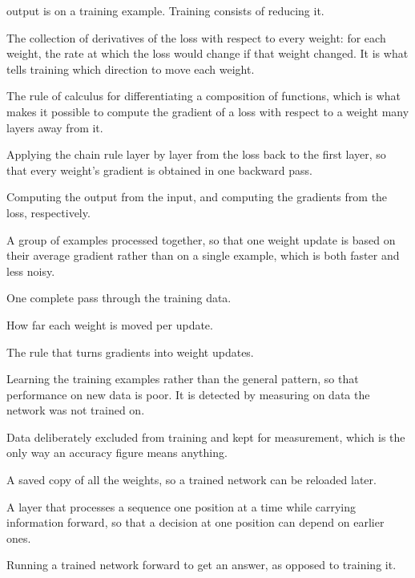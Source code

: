 \begin{description}[style=nextline,leftmargin=1.4em]
        output is on a training example. Training consists of reducing it.
  \item[Gradient] The collection of derivatives of the loss with respect to
        every weight: for each weight, the rate at which the loss would
        change if that weight changed. It is what tells training which
        direction to move each weight.
  \item[Chain rule] The rule of calculus for differentiating a composition of
        functions, which is what makes it possible to compute the gradient of
        a loss with respect to a weight many layers away from it.
  \item[Backpropagation] Applying the chain rule layer by layer from the loss
        back to the first layer, so that every weight's gradient is obtained
        in one backward pass.
  \item[Forward pass, backward pass] Computing the output from the input, and
        computing the gradients from the loss, respectively.
  \item[Batch] A group of examples processed together, so that one weight
        update is based on their average gradient rather than on a single
        example, which is both faster and less noisy.
  \item[Epoch] One complete pass through the training data.
  \item[Learning rate] How far each weight is moved per update.
  \item[Optimiser] The rule that turns gradients into weight updates.
  \item[Overfitting] Learning the training examples rather than the general
        pattern, so that performance on new data is poor. It is detected by
        measuring on data the network was not trained on.
  \item[Holdout, or validation set] Data deliberately excluded from training
        and kept for measurement, which is the only way an accuracy figure
        means anything.
  \item[Checkpoint] A saved copy of all the weights, so a trained network can
        be reloaded later.
  \item[Recurrent layer] A layer that processes a sequence one position at a
        time while carrying information forward, so that a decision at one
        position can depend on earlier ones.
  \item[Inference] Running a trained network forward to get an answer, as
        opposed to training it.
\end{description}

